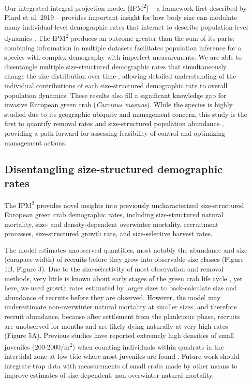\documentclass{article}
\begin{document}
Our integrated integral projection model (IPM\textsuperscript{2}) – a framework first described by Plard et al. 2019 – provides important insight for how body size can modulate many individual-level demographic rates that interact to describe population-level dynamics \parencite{plard2019ipm}. The IPM\textsuperscript{2} produces an outcome greater than the sum of its parts: combining information in multiple datasets facilitates population inference for a species with complex demography with imperfect measurements. We are able to disentangle multiple size-structured demographic rates that simultaneously change the size distribution over time \parencite{sogard1997size, carlson2010bayesian}, allowing detailed understanding of the individual contributions of each size-structured demographic rate to overall population dynamics. These results also fill a significant knowledge gap for invasive European green crab (\textit{Carcinus maenas}). While the species is highly studied due to its geographic ubiquity and management concern, this study is the first to quantify removal rates and size-structured population abundance \parencite{young2019life}, providing a path forward for assessing feasibility of control and optimizing management actions.

\subsection{Disentangling size-structured demographic rates}

The IPM\textsuperscript{2} provides novel insights into previously uncharacterized size-structured European green crab demographic rates, including size-structured natural mortality, size- and density-dependent overwinter mortality, recruitment processes, size-structured growth rate, and size-selective harvest rates. 

The model estimates unobserved quantities, most notably the abundance and size (carapace width) of recruits before they grow into observable size classes (Figure 1B, Figure 3). Due to the size-selectivity of most observation and removal methods, very little is known about early stages of the green crab life cycle \parencite{yamada2005growth}, yet here, we used growth rates estimated by larger sizes to back-calculate size and abundance of recruits before they are observed. However, the model may underestimate non-overwinter natural mortality at smaller sizes, and therefore recruit abundance, because after settlement from the planktonic phase, recruits are unobserved for months and are likely dying naturally at very high rates (Figure 5A). Previous studies have reported extremely high densities of small juveniles (200-2000/m\textsuperscript{2}) when counting individuals within quadrats in the intertidal zone at low tide where most juveniles are found \parencite{breteler1976settlement, thiel1994recruitment}. Future work should integrate trap data with measurements of small crabs made by other means to improve estimates of size-dependent, non-overwinter natural mortality.
\end{document}
